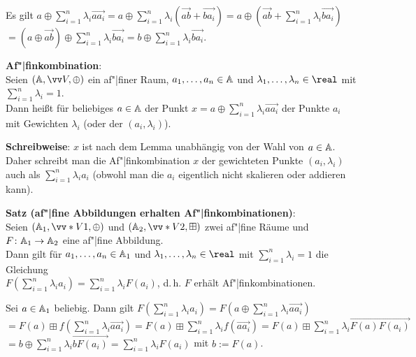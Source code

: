 \begin{Beweis}
    Es gilt
    $a \oplus \sum_{i=1}^n \lambda_i \vec{aa_i}
    = a \oplus \sum_{i=1}^n \lambda_i (\vec{ab} + \vec{ba_i})
    = a \oplus (\vec{ab} + \sum_{i=1}^n \lambda_i \vec{ba_i})$\\
    $= (a \oplus \vec{ab}) \oplus \sum_{i=1}^n \lambda_i \vec{ba_i}
    = b \oplus \sum_{i=1}^n \lambda_i \vec{ba_i}$.
\end{Beweis}

\linie

\textbf{Af"|finkombination}:\\
Seien $(\AA, \vec{V}, \oplus)$ ein af"|finer Raum,
$a_1, \dotsc, a_n \in \AA$ und $\lambda_1, \dotsc, \lambda_n \in \real$
mit $\sum_{i=1}^n \lambda_i = 1$.\\
Dann heißt für beliebiges $a \in \AA$
der Punkt $x = a \oplus \sum_{i=1}^n \lambda_i \vec{aa_i}$ 
der Punkte $a_i$ mit Gewichten $\lambda_i$
(oder der  $(a_i, \lambda_i)$).

\textbf{Schreibweise}:
$x$ ist nach dem Lemma unabhängig von der Wahl von $a \in \AA$.
Daher schreibt man die Af"|finkombination $x$ der gewichteten Punkte $(a_i, \lambda_i)$ auch
als $\sum_{i=1}^n \lambda_i a_i$
(obwohl man die $a_i$ eigentlich nicht skalieren oder addieren kann).

\linie

\textbf{Satz (af"|fine Abbildungen erhalten Af"|finkombinationen)}:\\
Seien $(\AA_1, \vec*{V}{1}, \oplus)$ und $(\AA_2, \vec*{V}{2}, \boxplus)$ zwei af"|fine Räume
und $F\colon \AA_1 \to \AA_2$ eine af"|fine Abbildung.\\
Dann gilt für $a_1, \dotsc, a_n \in \AA_1$ und $\lambda_1, \dotsc, \lambda_n \in \real$
mit $\sum_{i=1}^n \lambda_i = 1$
die Gleichung\\
$F(\sum_{i=1}^n \lambda_i a_i) = \sum_{i=1}^n \lambda_i F(a_i)$,
d.\,h. $F$ erhält Af"|finkombinationen.

\begin{Beweis}
    Sei $a \in \AA_1$ beliebig.
    Dann gilt
    $F(\sum_{i=1}^n \lambda_i a_i)
    = F(a \oplus \sum_{i=1}^n \lambda_i \vec{aa_i})$\\
    $= F(a) \boxplus f(\sum_{i=1}^n \lambda_i \vec{aa_i})
    = F(a) \boxplus \sum_{i=1}^n \lambda_i f(\vec{aa_i})
    = F(a) \boxplus \sum_{i=1}^n \lambda_i \vec{F(a)F(a_i)}$\\
    $= b \oplus \sum_{i=1}^n \lambda_i \vec{b F(a_i)}
    = \sum_{i=1}^n \lambda_i F(a_i)$
    mit $b := F(a)$.
\end{Beweis}

